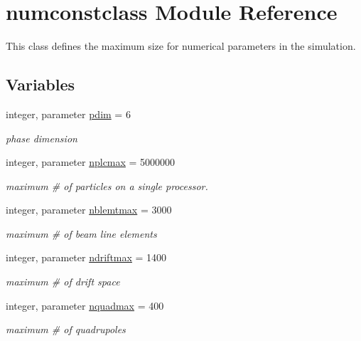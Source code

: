 \hypertarget{namespacenumconstclass}{}\section{numconstclass Module Reference}
\label{namespacenumconstclass}


This class defines the maximum size for numerical parameters in the simulation.  


\subsection*{Variables}
\begin{DoxyCompactItemize}
\item 
integer, parameter \mbox{\hyperlink{namespacenumconstclass_a24da80ebccca40a65c454aff1bd28e7f}{pdim}} = 6
\begin{DoxyCompactList}\small\item\em phase dimension \end{DoxyCompactList}\item 
integer, parameter \mbox{\hyperlink{namespacenumconstclass_a6bb8beba48502784bfcd08114a616b9b}{nplcmax}} = 5000000
\begin{DoxyCompactList}\small\item\em maximum \# of particles on a single processor. \end{DoxyCompactList}\item 
integer, parameter \mbox{\hyperlink{namespacenumconstclass_a83ab51ec1dd55c167600999fca072524}{nblemtmax}} = 3000
\begin{DoxyCompactList}\small\item\em maximum \# of beam line elements \end{DoxyCompactList}\item 
integer, parameter \mbox{\hyperlink{namespacenumconstclass_a22030f070a90c877bef951b411dac428}{ndriftmax}} = 1400
\begin{DoxyCompactList}\small\item\em maximum \# of drift space \end{DoxyCompactList}\item 
integer, parameter \mbox{\hyperlink{namespacenumconstclass_a93ef59ed830442249dee14d677ddeb08}{nquadmax}} = 400
\begin{DoxyCompactList}\small\item\em maximum \# of quadrupoles \end{DoxyCompactList}\item 

\end{DoxyCompactItemize}
